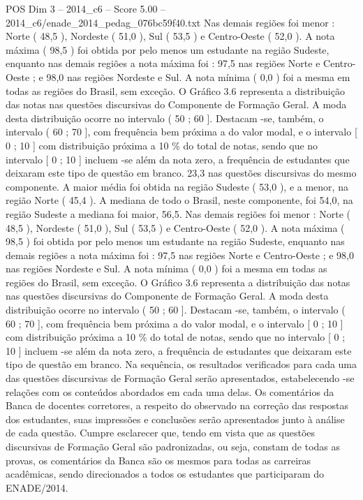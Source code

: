 \begin{textsample}{POS Dim 3 – 2014\_c6 – Score 5.00 – 2014\_c6/enade\_2014\_pedag\_076bc59f40.txt}
Nas demais regiões foi menor : Norte ( 48,5 ), Nordeste ( 51,0 ), Sul ( 53,5 ) e Centro-Oeste ( 52,0 ).
A nota máxima ( 98,5 ) foi obtida por pelo menos um estudante na região Sudeste, enquanto nas demais regiões a nota máxima foi : 97,5 nas regiões Norte e Centro-Oeste ; e 98,0 nas regiões Nordeste e Sul.
A nota mínima ( 0,0 ) foi a mesma em todas as regiões do Brasil, sem exceção.
O Gráfico 3.6 representa a distribuição das notas nas questões discursivas do Componente de Formação Geral.
A moda desta distribuição ocorre no intervalo ( 50 ; 60 ].
Destacam -se, também, o intervalo ( 60 ; 70 ], com frequência bem próxima a do valor modal, e o intervalo [ 0 ; 10 ] com distribuição próxima a 10 \% do total de notas, sendo que no intervalo [ 0 ; 10 ] incluem -se além da nota zero, a frequência de estudantes que deixaram este tipo de questão em branco. 23,3 nas questões discursivas do mesmo componente.
A maior média foi obtida na região Sudeste ( 53,0 ), e a menor, na região Norte ( 45,4 ).
A mediana de todo o Brasil, neste componente, foi 54,0, na região Sudeste a mediana foi maior, 56,5.
Nas demais regiões foi menor : Norte ( 48,5 ), Nordeste ( 51,0 ), Sul ( 53,5 ) e Centro-Oeste ( 52,0 ).
A nota máxima ( 98,5 ) foi obtida por pelo menos um estudante na região Sudeste, enquanto nas demais regiões a nota máxima foi : 97,5 nas regiões Norte e Centro-Oeste ; e 98,0 nas regiões Nordeste e Sul.
A nota mínima ( 0,0 ) foi a mesma em todas as regiões do Brasil, sem exceção.
O Gráfico 3.6 representa a distribuição das notas nas questões discursivas do Componente de Formação Geral.
A moda desta distribuição ocorre no intervalo ( 50 ; 60 ].
Destacam -se, também, o intervalo ( 60 ; 70 ], com frequência bem próxima a do valor modal, e o intervalo [ 0 ; 10 ] com distribuição próxima a 10 \% do total de notas, sendo que no intervalo [ 0 ; 10 ] incluem -se além da nota zero, a frequência de estudantes que deixaram este tipo de questão em branco.
Na sequência, os resultados verificados para cada uma das questões discursivas de Formação Geral serão apresentados, estabelecendo -se relações com os conteúdos abordados em cada uma delas.
Os comentários da Banca de docentes corretores, a respeito do observado na correção das respostas dos estudantes, suas impressões e conclusões serão apresentados junto à análise de cada questão.
Cumpre esclarecer que, tendo em vista que as questões discursivas de Formação Geral são padronizadas, ou seja, constam de todas as provas, os comentários da Banca são os mesmos para todas as carreiras acadêmicas, sendo direcionados a todos os estudantes que participaram do ENADE/2014.

\end{textsample}
